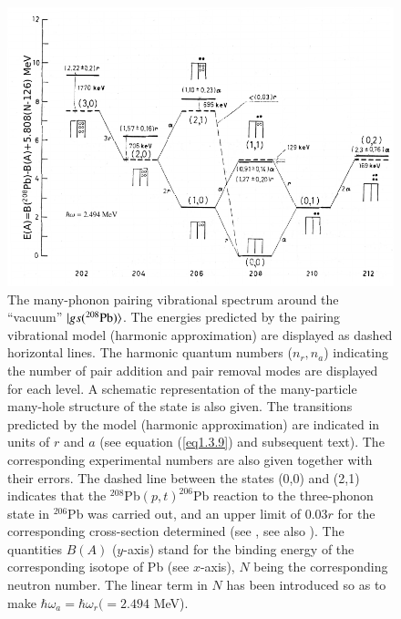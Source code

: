 \begin{figure}
	\centerline {
		\includegraphics*[width=15cm, angle=0.]{introduccion/figs/fig1_3_2}
	}
	\caption{The many-phonon pairing vibrational spectrum around the ``vacuum'' $|{gs(^{208}\text{Pb})} \rangle$. The energies predicted by the pairing vibrational model (harmonic approximation) are displayed as dashed horizontal lines. The harmonic quantum numbers ($n_r,n_a$) indicating the number of pair addition and pair removal modes are displayed for each level. A schematic representation of the many-particle many-hole structure of the state is also given. The transitions predicted by the model (harmonic approximation) are indicated in units of $r$ and $a$ (see equation (\ref{eq1.3.9}) and subsequent text). The corresponding experimental numbers are also given together with their errors. The dashed line between the states (0,0) and (2,1) indicates that the $^{208}$Pb$(p,t)^{206}$Pb reaction to the three-phonon state in $^{206}$Pb was carried out, and an upper limit of 0.03$r$ for the corresponding cross-section  determined (see \cite{Flynn:72} \cite{Broglia:73}, see also \cite{Lanford:73}). The quantities $B(A)$ ($y$-axis) stand for the binding energy of the corresponding isotope of Pb (see $x$-axis), $N$ being the corresponding neutron number. The linear term in $N$ has been introduced so as to make $\hbar\omega_a=\hbar\omega_r(=2.494$ MeV).}
	\label{fig0.3.2}
\end{figure}

